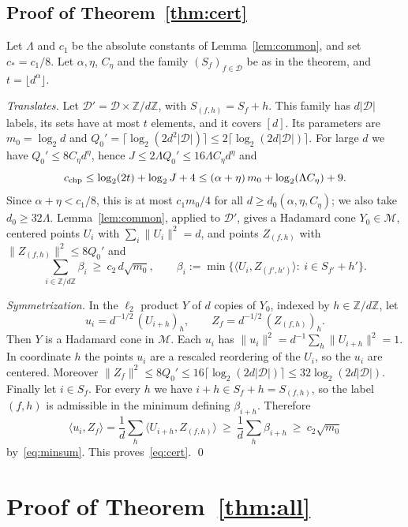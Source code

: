 \documentclass[11pt]{article}
\theoremstyle{remark}
\newcommand{\Z}{\mathbb Z}
\newcommand{\cM}{\mathcal M}
\newcommand{\cD}{\mathcal D}
\newcommand{\ip}[2]{\langle #1,#2\rangle}
\newcommand{\norm}[1]{\lVert #1\rVert}
\begin{document}
\subsection{Proof of Theorem~\ref{thm:cert}}
Let \(\Lambda\) and \(c_1\) be the absolute constants of
Lemma~\ref{lem:common}, and set \(c_*=c_1/8\). Let \(\alpha,\eta\),
\(C_\eta\) and the family \((S_f)_{f\in\cD}\) be as in the theorem, and
\(t=\lfloor d^\alpha\rfloor\).

\emph{Translates.}
Let \(\cD'=\cD\times\Z/d\Z\), with \(S_{(f,h)}=S_f+h\). This family has
\(d|\cD|\) labels, its sets have at most \(t\) elements, and it covers
\([d]\). Its parameters are \(m_0=\log_2d\) and
\(Q_0'=\lceil\log_2(2d^2|\cD|)\rceil\le2\lceil\log_2(2d|\cD|)\rceil\).
For large \(d\) we have \(Q_0'\le8C_\eta d^\eta\), hence
\(J\le2\Lambda Q_0'\le16\Lambda C_\eta d^\eta\) and
\[
 c_{\rm chp}\le\log_2(2t)+\log_2J+4
   \le(\alpha+\eta)\,m_0+\log_2(\Lambda C_\eta)+9 .
\]
Since \(\alpha+\eta<c_1/8\), this is at most \(c_1m_0/4\) for all
\(d\ge d_0(\alpha,\eta,C_\eta)\); we also take \(d_0\ge32\Lambda\).
Lemma~\ref{lem:common}, applied to \(\cD'\), gives a Hadamard cone
\(Y_0\in\cM\), centered points \(U_i\) with \(\sum_i\norm{U_i}^2=d\), and
points \(Z_{(f,h)}\) with \(\norm{Z_{(f,h)}}^2\le8Q_0'\) and
\begin{equation}\label{eq:minsum}
 \sum_{i\in\Z/d\Z}\beta_i\ \ge\ c_2\,d\sqrt{m_0},\qquad
 \beta_i:=\min\bigl\{\ip{U_i}{Z_{(f',h')}}:\ i\in S_{f'}+h'\bigr\}.
\end{equation}

\emph{Symmetrization.}
In the \(\ell_2\) product \(Y\) of \(d\) copies of \(Y_0\), indexed by
\(h\in\Z/d\Z\), let
\[
 u_i=d^{-1/2}\,(U_{i+h})_h,\qquad Z_f=d^{-1/2}\,(Z_{(f,h)})_h .
\]
Then \(Y\) is a Hadamard cone in \(\cM\). Each \(u_i\) has
\(\norm{u_i}^2=d^{-1}\sum_h\norm{U_{i+h}}^2=1\). In coordinate \(h\) the
points \(u_i\) are a rescaled reordering of the \(U_i\), so the \(u_i\)
are centered. Moreover
\(\norm{Z_f}^2\le8Q_0'\le16\lceil\log_2(2d|\cD|)\rceil
\le32\log_2(2d|\cD|)\). Finally let
\(i\in S_f\). For every \(h\) we have \(i+h\in S_f+h=S_{(f,h)}\), so the
label \((f,h)\) is admissible in the minimum defining \(\beta_{i+h}\).
Therefore
\[
 \ip{u_i}{Z_f}=\frac1d\sum_h\ip{U_{i+h}}{Z_{(f,h)}}
   \ \ge\ \frac1d\sum_h\beta_{i+h}\ \ge\ c_2\sqrt{m_0}
\]
by~\eqref{eq:minsum}. This proves~\eqref{eq:cert}. \qed

\section{Proof of Theorem~\ref{thm:all}}\label{sec:proof-all}
\end{document}
